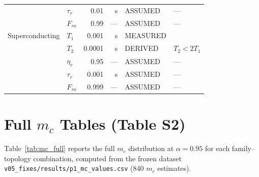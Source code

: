 \documentclass[aps,prapplied,reprint,superscriptaddress]{revtex4-2}
\begin{document}
\begin{table}[htbp]
{\begin{tabular}{llrrll}
 & $\tau_r$ & 0.01 & s & ASSUMED & --- \\
 & $F_{ro}$ & 0.99 & --- & ASSUMED & --- \\
\midrule
Superconducting & $T_1$ & 0.001 & s & MEASURED & \cite{reagor2016quantum} \\
 & $T_2$ & 0.0001 & s & DERIVED & $T_2 < 2T_1$ \\
 & $\eta_r$ & 0.95 & --- & ASSUMED & --- \\
 & $\tau_r$ & 0.001 & s & ASSUMED & --- \\
 & $F_{ro}$ & 0.999 & --- & ASSUMED & --- \\
\bottomrule
\end{tabular}%
}
\end{table}

\section{Full $m_c$ Tables (Table S2)}

Table~\ref{tab:mc_full} reports the full $m_c$ distribution at $\alpha = 0.95$ for each family--topology combination, computed from the frozen dataset \texttt{v05\_fixes/results/p1\_mc\_values.csv} (840 $m_c$ estimates).
\end{document}
